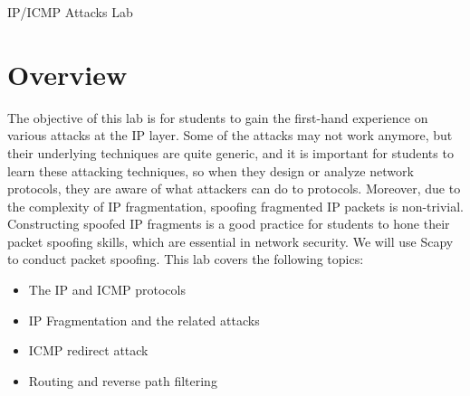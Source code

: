 




\newcommand{\ipFigs}{./Figs}






\begin{center}
{\LARGE IP/ICMP Attacks Lab}
\end{center}



\section{Overview}

The objective of this lab is for students to gain the first-hand experience 
on various attacks at the IP layer. Some of the attacks may not work anymore,
but their underlying techniques are quite generic, and it
is important for students to learn these attacking techniques, so when they design
or analyze network protocols, they are aware of what attackers can do to protocols.
Moreover, due to the complexity of IP fragmentation, spoofing fragmented IP packets
is non-trivial.  Constructing spoofed 
IP fragments is a good practice for students to hone their
packet spoofing skills, which are essential in network security.  
We will use Scapy to conduct packet spoofing.  
This lab covers the following topics:

\begin{itemize}[noitemsep]
\item The IP and ICMP protocols
\item IP Fragmentation and the related attacks
\item ICMP redirect attack
\item Routing and reverse path filtering 
\end{itemize}



